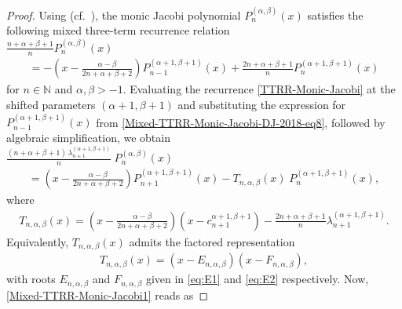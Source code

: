 \documentclass[final,3p,times,12pt]{elsarticle}
\numberwithin{equation}{section}  %
\begin{document}
	
	\begin{proof}
		Using (cf.~\cite[eq.~(8)]{Driver-Jordaan-NumerAlg-2018}), the monic Jacobi polynomial $P^{(\alpha,\beta)}_n(x)$ satisfies the following mixed three-term recurrence relation\\
		
		$\displaystyle \frac{n+\alpha+\beta+1}{n}P^{(\alpha, \beta)}_{n}(x)$
		\begin{align}\label{Mixed-TTRR-Monic-Jacobi-DJ-2018-eq8}
			=- \left(x - \frac{\alpha-\beta}{2n+\alpha+\beta+2}\right) P^{(\alpha+1, \beta+1)}_{n-1}(x)+\frac{2n+\alpha+\beta+1}{n} P^{(\alpha+1, \beta+1)}_{n}(x) 
		\end{align}
		for $n \in \mathbb{N}$ and $\alpha, \beta > -1$. Evaluating the recurrence \eqref{TTRR-Monic-Jacobi} at the shifted parameters $(\alpha+1,\beta+1)$ and substituting the expression for $P_{n-1}^{(\alpha+1,\beta+1)}(x)$ from \eqref{Mixed-TTRR-Monic-Jacobi-DJ-2018-eq8}, followed by algebraic simplification, we obtain\\
		
		$\displaystyle 	\frac{(n+\alpha+\beta+1)\,\lambda_{n+1}^{(\alpha+1,\beta+1)}}{n}\;
		{P}_{n}^{(\alpha,\beta)}(x)
		$
		\begin{align}
			\label{Mixed-TTRR-Monic-Jacobi1}
			=\left(x - \frac{\alpha-\beta}{2n+\alpha+\beta+2}\right)
			{P}_{n+1}^{(\alpha+1,\beta+1)}(x)
			- T_{n,\alpha,\beta}(x)\;
			{P}_{n}^{(\alpha+1,\beta+1)}(x),
		\end{align}
		where 
		\begin{align}
			\label{T-coeff-form}
			T_{n,\alpha,\beta}(x)
			=
			\left(x - \frac{\alpha-\beta}{2n+\alpha+\beta+2}\right)
			\left(x - c_{n+1}^{\alpha+1,\beta+1}\right)
			- \frac{2n+\alpha+\beta+1}{n}\lambda_{n+1}^{(\alpha+1,\beta+1)}.
		\end{align}
		Equivalently, $T_{n,\alpha,\beta}(x)$ admits the factored representation
		\begin{align}
			\label{eq:factored_form}
			T_{n,\alpha,\beta}(x) = (x - E_{n,\alpha,\beta})(x - F_{n,\alpha,\beta}),
		\end{align}
		with roots $E_{n,\alpha,\beta}$ and $F_{n,\alpha,\beta}$ given in \eqref{eq:E1} and \eqref{eq:E2}	respectively.	
		Now, \eqref{Mixed-TTRR-Monic-Jacobi1} reads as
		

\end{proof}
\end{document}
